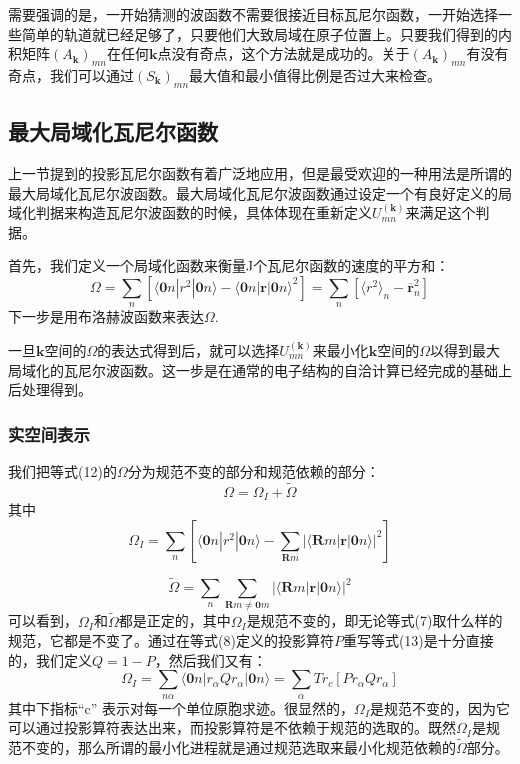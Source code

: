 需要强调的是，一开始猜测的波函数不需要很接近目标瓦尼尔函数，一开始选择一些简单的轨道就已经足够了，只要他们大致局域在原子位置上。只要我们得到的内积矩阵$(A_{\bm{k}})_{mn}$在任何$\bm{k}$点没有奇点，这个方法就是成功的。关于$(A_{\bm{k}})_{mn}$有没有奇点，我们可以通过$(S_{\bm{k}})_{mn}$最大值和最小值得比例是否过大来检查。

\subsection{最大局域化瓦尼尔函数}
上一节提到的投影瓦尼尔函数有着广泛地应用，但是最受欢迎的一种用法是所谓的最大局域化瓦尼尔波函数。最大局域化瓦尼尔波函数通过设定一个有良好定义的局域化判据来构造瓦尼尔波函数的时候，具体体现在重新定义$U^{(\bm{k})}_{mn}$来满足这个判据。

首先，我们定义一个局域化函数来衡量J个瓦尼尔函数的速度的平方和：
\begin{equation}
\Omega=\sum_n [\langle\bm{0} n | r^2 | \bm{0}n \rangle -\langle \bm{0}n|\bm{r}|\bm{0}n\rangle^2]=\sum_n[\langle r^2\rangle_n-\bm{\overline r}^2_n]
\end{equation}
下一步是用布洛赫波函数来表达$\Omega$.

一旦$\bm{k}$空间的$\Omega$的表达式得到后，就可以选择$U^{(\bm{k})}_{mn}$来最小化$\bm{k}$空间的$\Omega$以得到最大局域化的瓦尼尔波函数。这一步是在通常的电子结构的自洽计算已经完成的基础上后处理得到。


\subsubsection{实空间表示}
我们把等式(12)的$\Omega$分为规范不变的部分和规范依赖的部分：
\begin{equation}
\Omega=\Omega_I+\widetilde\Omega
\end{equation}
其中
\begin{equation}
\Omega_I=\sum_n [\langle\bm{0} n | r^2 | \bm{0}n \rangle -\sum_{\bm{R}m}|\langle \bm{R}m|\bm{r}|\bm{0}n\rangle|^2] 
\end{equation}

\begin{equation}
\widetilde \Omega=\sum_n \sum_{\bm{R}m\neq \bm{0}m}|\langle \bm{R}m|\bm{r}|\bm{0}n\rangle|^2
\end{equation}
可以看到，$\Omega_I$和$ \widetilde \Omega$都是正定的，其中$\Omega_I$是规范不变的，即无论等式(7)取什么样的规范，它都是不变了。通过在等式(8)定义的投影算符$P$重写等式(13)是十分直接的，我们定义$Q=1-P$，然后我们又有：
\begin{equation}
\Omega_I=\sum_{n\alpha} \langle\bm{0} n | r_\alpha Q  r_\alpha  | \bm{0}n \rangle=\sum_\alpha Tr_c[P r_\alpha Q r_\alpha]
\end{equation}
其中下指标“c” 表示对每一个单位原胞求迹。很显然的，$\Omega_I$是规范不变的，因为它可以通过投影算符表达出来，而投影算符是不依赖于规范的选取的。既然$\Omega_I$是规范不变的，那么所谓的最小化进程就是通过规范选取来最小化规范依赖的$ \widetilde \Omega$部分。


